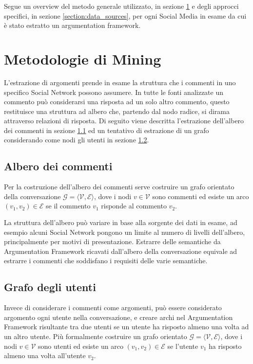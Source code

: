 

Segue un overview del metodo generale utilizzato, in sezione \ref{section:approcci} e degli approcci specifici, in sezione \ref{section:data_sources}, per ogni Social Media in esame da cui è stato estratto un argumentation framework.

\section{Metodologie di Mining}
\label{section:approcci}
L'estrazione di argomenti prende in esame la struttura che i commenti in uno specifico Social Network possono assumere. In tutte le fonti analizzate un commento può considerarsi una risposta ad un solo altro commento, questo restituisce una struttura ad albero che, partendo dal nodo radice, si dirama attraverso relazioni di risposta. Di seguito viene descritta l'estrazione dell'albero dei commenti in sezione \ref{subsection:albero_commenti} ed un tentativo di estrazione di un grafo considerando come nodi gli utenti in sezione \ref{subsection:grafo_utenti}.

\subsection{Albero dei commenti}
\label{subsection:albero_commenti}
Per la costruzione dell'albero dei commenti serve costruire un grafo orientato della conversazione $\mathcal{G = ⟨V, E⟩}$, dove i nodi $v \in \mathcal{V}$ sono commenti ed esiste un arco $(v_1,v_2) \in \mathcal{E}$ se il commento $v_1$ risponde al commento $v_2$.

La struttura dell'albero può variare in base alla sorgente dei dati in esame, ad esempio alcuni Social Network pongono un limite al numero di livelli dell'albero, principalmente per motivi di presentazione.
Estrarre delle semantiche da Argumentation Framework ricavati dall'albero della conversazione equivale ad estrarre i commenti che soddisfano i requisiti delle varie semantiche.

\subsection{Grafo degli utenti}
\label{subsection:grafo_utenti}
Invece di considerare i commenti come argomenti, può essere considerato argomento ogni utente nella conversazione, e creare archi nel Argumentation Framework risultante tra due utenti se un utente ha risposto almeno una volta ad un altro utente. Più formalmente costruire un grafo orientato $\mathcal{G = ⟨V, E⟩}$, dove i nodi $v \in \mathcal{V}$ sono utenti ed esiste un arco $(v_1,v_2) \in \mathcal{E}$ se l'utente $v_1$ ha risposto almeno una volta all'utente $v_2$.

